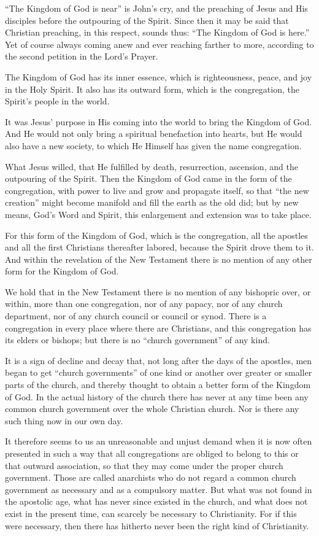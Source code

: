 “The Kingdom of God is near” is John’s cry, and the preaching of Jesus and His disciples before the outpouring of the Spirit. Since then it may be said that Christian preaching, in this respect, sounds thus: “The Kingdom of God is here.” Yet of course always coming anew and ever reaching farther to more, according to the second petition in the Lord’s Prayer.

The Kingdom of God has its inner essence, which is righteousness, peace, and joy in the Holy Spirit. It also has its outward form, which is the congregation, the Spirit’s people in the world.

It was Jesus’ purpose in His coming into the world to bring the Kingdom of God. And He would not only bring a spiritual benefaction into hearts, but He would also have a new society, to which He Himself has given the name congregation.

What Jesus willed, that He fulfilled by death, resurrection, ascension, and the outpouring of the Spirit. Then the Kingdom of God came in the form of the congregation, with power to live and grow and propagate itself, so that “the new creation” might become manifold and fill the earth as the old did; but by new means, God’s Word and Spirit, this enlargement and extension was to take place.

For this form of the Kingdom of God, which is the congregation, all the apostles and all the first Christians thereafter labored, because the Spirit drove them to it. And within the revelation of the New Testament there is no mention of any other form for the Kingdom of God.

We hold that in the New Testament there is no mention of any bishopric over, or within, more than one congregation, nor of any papacy, nor of any church department, nor of any church council or council or synod. There is a congregation in every place where there are Christians, and this congregation has its elders or bishops; but there is no “church government” of any kind.

It is a sign of decline and decay that, not long after the days of the apostles, men began to get “church governments” of one kind or another over greater or smaller parts of the church, and thereby thought to obtain a better form of the Kingdom of God. In the actual history of the church there has never at any time been any common church government over the whole Christian church. Nor is there any such thing now in our own day.

It therefore seems to us an unreasonable and unjust demand when it is now often presented in such a way that all congregations are obliged to belong to this or that outward association, so that they may come under the proper church government. Those are called anarchists who do not regard a common church government as necessary and as a compulsory matter. But what was not found in the apostolic age, what has never since existed in the church, and what does not exist in the present time, can scarcely be necessary to Christianity. For if this were necessary, then there has hitherto never been the right kind of Christianity.

